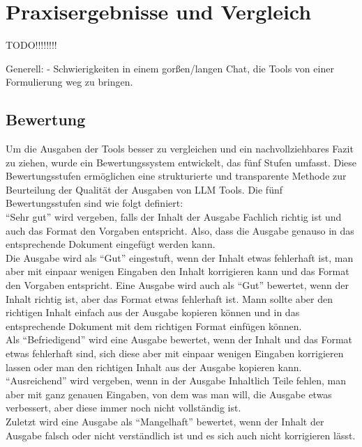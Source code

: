 
\chapter{Praxisergebnisse und Vergleich} 

TODO!!!!!!!!

Generell:
    - Schwierigkeiten in einem gorßen/langen Chat, die Tools von einer Formulierung weg zu bringen. 


\section{Bewertung}  \label{BewertungLLMTools}

Um die Ausgaben der Tools besser zu vergleichen und ein nachvollziehbares Fazit zu ziehen, wurde ein Bewertungssystem 
entwickelt, das fünf Stufen umfasst. Diese Bewertungsstufen ermöglichen eine strukturierte und transparente Methode 
zur Beurteilung der Qualität der Ausgaben von LLM Tools. Die fünf Bewertungsstufen sind wie folgt definiert:\\

``Sehr gut'' wird vergeben, falls der Inhalt der Ausgabe Fachlich richtig ist und auch das Format den Vorgaben entspricht.
Also, dass die Ausgabe genauso in das entsprechende Dokument eingefügt werden kann.\\
Die Ausgabe wird als ``Gut'' eingestuft, wenn der Inhalt etwas fehlerhaft ist, man aber mit einpaar wenigen Eingaben 
den Inhalt korrigieren kann und das Format den Vorgaben entspricht. Eine Ausgabe wird auch als ``Gut'' bewertet, wenn 
der Inhalt richtig ist, aber das Format etwas fehlerhaft ist. Mann sollte aber den richtigen Inhalt einfach aus der 
Ausgabe kopieren können und in das entsprechende Dokument mit dem richtigen Format einfügen können.\\
Als ``Befriedigend'' wird eine Ausgabe bewertet, wenn der Inhalt und das Format etwas fehlerhaft sind, sich diese aber 
mit einpaar wenigen Eingaben korrigieren lassen oder man den richtigen Inhalt aus der Ausgabe kopieren kann.\\
``Ausreichend'' wird vergeben, wenn in der Ausgabe Inhaltlich Teile fehlen, man aber mit ganz genauen Eingaben, von dem 
was man will, die Ausgabe etwas verbessert, aber diese immer noch nicht vollständig ist.\\
Zuletzt wird eine Ausgabe als ``Mangelhaft'' bewertet, wenn der Inhalt der Ausgabe falsch oder nicht verständlich ist
und es sich auch nicht korrigieren lässt.\\



